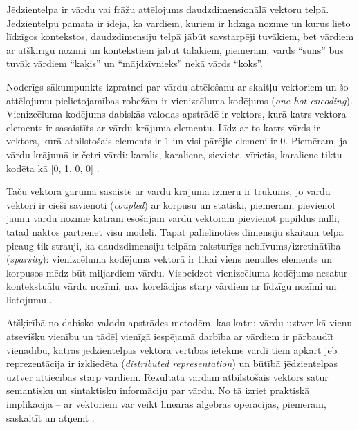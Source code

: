 Jēdzientelpa ir vārdu vai frāžu attēlojums daudzdimensionālā vektoru telpā. Jēdzientelpu pamatā ir ideja, ka vārdiem, kuriem ir līdzīga nozīme un kurus lieto līdzīgos kontekstos, daudzdimensiju telpā jābūt savstarpēji tuvākiem, bet vārdiem ar atšķirīgu nozīmi un kontekstiem jābūt tālākiem, piemēram, vārds “suns” būs tuvāk vārdiem “kaķis” un “mājdzīvnieks” nekā vārds “koks”.


Noderīgs sākumpunkts izpratnei par vārdu attēlošanu ar skaitļu vektoriem un šo attēlojumu pielietojamības robežām ir vienizcēluma kodējums (\textit{one hot encoding}). Vienizcēluma kodējums dabiskās valodas apstrādē ir vektors, kurā katrs vektora elements ir sasaistīts ar vārdu krājuma elementu. Līdz ar to katrs vārds ir vektors, kurā atbilstošais elements ir 1 un visi pārējie elemeni ir 0. Piemēram, ja vārdu krājumā ir četri vārdi: karalis, karaliene, sieviete, vīrietis, karaliene tiktu kodēta kā [0, 1, 0, 0] \cite{colyer2016}.

Taču vektora garuma sasaiste ar vārdu krājuma izmēru ir trūkums, jo vārdu vektori ir cieši savienoti (\textit{coupled}) ar korpusu un statiski, piemēram, pievienot jaunu vārdu nozīmē katram esošajam vārdu vektoram pievienot papildus nulli, tātad nāktos pārtrenēt visu modeli. Tāpat palielinoties dimensiju skaitam telpa pieaug tik strauji, ka daudzdimensiju telpām raksturīgs neblīvums/izretinātība (\textit{sparsity}): vienizcēluma kodējuma vektorā ir tikai viens nenulles elements un korpusos mēdz būt miljardiem 
vārdu. Visbeidzot vienizcēluma kodējums nesatur kontekstuālu vārdu nozīmi, nav korelācijas starp vārdiem ar līdzīgu nozīmi un lietojumu \cite{colyer2016}.

Atšķirībā no dabisko valodu apstrādes metodēm, kas katru vārdu uztver kā vienu atsevišķu vienību un tādēļ vienīgā iespējamā darbība ar vārdiem ir pārbaudīt vienādību, katras jēdzientelpas vektora vērtības ietekmē vārdi tiem apkārt jeb reprezentācija ir izkliedēta (\textit{distributed representation}) un būtībā jēdzientelpas uztver attiecības starp vārdiem. Rezultātā vārdam atbilstošais vektors satur semantisku un sintaktisku informāciju par vārdu. No tā izriet praktiskā implikācija -- ar vektoriem var veikt lineārās algebras operācijas, piemēram, saskaitīt un atņemt \cite{colyer2016}.


